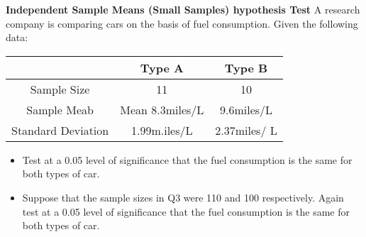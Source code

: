 \documentclass[a4paper,12pt]{article}
\begin{document}
	
 \textbf{Independent Sample Means (Small Samples) hypothesis Test }
	A research company is comparing cars on the basis of fuel consumption.
	Given the following data:
	\begin{center}
		\begin{tabular}{|c|c|c|} \hline
			&	Type A	&	Type B	\\	\hline
			Sample Size	&	11	&	10	\\	\hline
			Sample Meab	&	Mean 8.3miles/L	&	9.6miles/L	\\	\hline
			Standard Deviation &	1.99m.iles/L	&	2.37miles/ L	\\	\hline
		\end{tabular} 
		
	\end{center}
	
	\begin{itemize}
		\item Test at a 0.05 level of significance that the fuel consumption is the same for both types of car.
		
		\item Suppose that the sample sizes in Q3 were 110 and 100 respectively. Again test at a 0.05 level of significance that the fuel consumption is the same for both types of car.
	\end{itemize}
	
\end{document}
